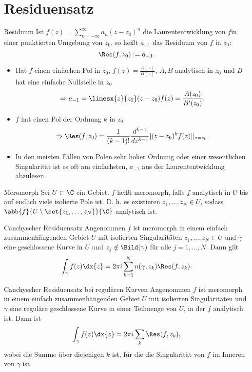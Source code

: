\section{Residuensatz}

\begin{karte}{Residuum}
    Ist \(f(z) = \sum_{n=-\infty}^\infty a_n (z-z_0)^n \) die Laurententwicklung 
    von \(f\)in einer punktierten Umgebung von \(z_0\), so heißt \(a_{-1}\) 
    das Residuum von \(f\) in \(z_0\):
    \[ \Res(f,z_0) := a_{-1}. \]
    \begin{itemize}
        \item Hat \(f\) einen einfachen Pol in 
        \(z_0\), \(f(z) = \frac{A(z)}{B(z)}\), \(A,B\) analytisch in \(z_0\)
        und \(B\) hat eine einfache Nullstelle in \(z_0\)
        \[ \Rightarrow a_{-1} = \limesx{z}{z_0} (z-z_0) f(z) = \frac{A(z_0)}{B'(z_0)}. \]
        \item \(f\) hat einen Pol der Ordnung \(k\) in \(z_0\)
        \[ \Rightarrow \Res(f,z_0) = \frac{1}{(k-1)!} \frac{d^{k-1}}{dz^{k-1}} [(z-z_0)^k f(z)]|_{z=z_0}. \]
        \item In den meisten Fällen von Polen sehr hoher Ordnung oder einer 
        wesentlichen Singularität ist es oft am einfachsten, \(a_{-1}\) aus der 
        Laurententwicklung abzulesen.
    \end{itemize}
\end{karte}

\begin{karte}{Meromorph}
    Sei \(U\subset \C\) ein Gebiet. \(f\) heißt meromorph, 
    falls \(f\) analytisch in \(U\) bis auf endlich viele isolierte Pole ist.
    D. h. es existieren \(z_1, \ldots, z_N \in U\), sodass 
    \(\abb{f}{U\setminus \set{z_1, \ldots, z_N}}{\C}\) analytisch ist.
\end{karte}

\begin{karte}{Cauchyscher Residuensatz}
    Angenommen \( f \) ist meromorph in einem einfach zusammenhängenden Gebiet 
    \(U\) mit isolierten Singularitäten \(z_1, \ldots,z_N\in U\) und \(\gamma\) 
    eine geschlossene Kurve in \(U\) und \(z_j \notin \Bild(\gamma)\) für alle 
    \(j=1,\ldots, N\). Dann gilt 
    \[ \int_\gamma f(z) \dx{z} = 2\pi i \sum_{k=1}^N n(\gamma, z_k) \Res(f,z_k). \]
\end{karte}

\begin{karte}{Cauchyscher Residuensatz bei regulären Kurven}
    Angenommen \(f\) ist meromorph in einem einfach zusammenhängenden Gebiet \(U\)
    mit isolierten Singularitäten und \(\gamma\) eine reguläre geschlossene 
    Kurve in einer Teilmenge von \(U\), in der \(f\) analytisch ist. Dann ist 
    \[ \int_\gamma f(z) \dx{z} = 2\pi i \sum_k \Res(f,z_k), \]
    wobei die Summe über diejenigen \(k\) ist, für die die Singularität von 
    \(f\) im Inneren von \(\gamma\) ist.
\end{karte}